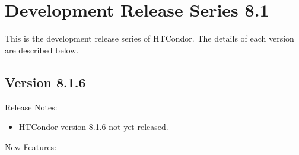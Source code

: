 
\section{\label{sec:History-8-1}Development Release Series 8.1}

This is the development release series of HTCondor.
The details of each version are described below.


\subsection*{\label{sec:New-8-1-6}Version 8.1.6}

\noindent Release Notes:

\begin{itemize}

\item HTCondor version 8.1.6 not yet released.

\end{itemize}


\noindent New Features:

